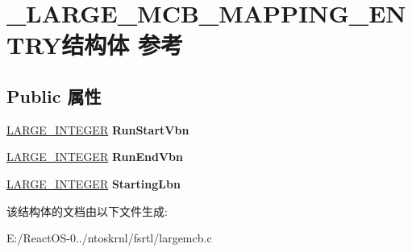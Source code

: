 \hypertarget{struct___l_a_r_g_e___m_c_b___m_a_p_p_i_n_g___e_n_t_r_y}{}\section{\+\_\+\+L\+A\+R\+G\+E\+\_\+\+M\+C\+B\+\_\+\+M\+A\+P\+P\+I\+N\+G\+\_\+\+E\+N\+T\+R\+Y结构体 参考}
\label{struct___l_a_r_g_e___m_c_b___m_a_p_p_i_n_g___e_n_t_r_y}
\subsection*{Public 属性}
\begin{DoxyCompactItemize}
\item 
\mbox{\label{struct___l_a_r_g_e___m_c_b___m_a_p_p_i_n_g___e_n_t_r_y_aab69ffc11c47cd713609e32405531330}} 
\hyperlink{union___l_a_r_g_e___i_n_t_e_g_e_r}{L\+A\+R\+G\+E\+\_\+\+I\+N\+T\+E\+G\+ER} {\bfseries Run\+Start\+Vbn}
\item 
\mbox{\label{struct___l_a_r_g_e___m_c_b___m_a_p_p_i_n_g___e_n_t_r_y_a0697793014f8c072ba00dd3f63b0091c}} 
\hyperlink{union___l_a_r_g_e___i_n_t_e_g_e_r}{L\+A\+R\+G\+E\+\_\+\+I\+N\+T\+E\+G\+ER} {\bfseries Run\+End\+Vbn}
\item 
\mbox{\label{struct___l_a_r_g_e___m_c_b___m_a_p_p_i_n_g___e_n_t_r_y_ad342c6fe9419a3985d4ecfe11f1d75ba}} 
\hyperlink{union___l_a_r_g_e___i_n_t_e_g_e_r}{L\+A\+R\+G\+E\+\_\+\+I\+N\+T\+E\+G\+ER} {\bfseries Starting\+Lbn}
\end{DoxyCompactItemize}


该结构体的文档由以下文件生成\+:\begin{DoxyCompactItemize}
\item 
E\+:/\+React\+O\+S-\/0../ntoskrnl/fsrtl/largemcb.\+c\end{DoxyCompactItemize}
